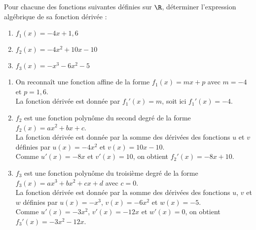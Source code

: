 \documentclass[a4paper,11pt,exos]{nsi} %
\begin{document}

\maketitle

\begin{exercice}
    Pour chacune des fonctions suivantes définies sur $\R$, déterminer l'expression algébrique de sa fonction dérivée :
    \begin{multicols}{3}
        \begin{enumerate}
            \item $f_1(x)=-4x+1{,}6$
        
            \item $f_2(x)= -4x^2+10x-10$
            \item $f_3(x)= -x^3-6x^2-5$
        \end{enumerate}
    \end{multicols}
    
    \end{exercice}

        \begin{enumerate}
            \item On reconnaît une fonction affine de la forme $f_1(x)=mx+p$ avec $m=-4$ et $p=1{,}6$.\\
            La fonction dérivée est donnée par $f_1'(x)=m$, soit ici $f_1'(x)=-4$.
        
            \item $f_2$ est une fonction polynôme du second degré de la forme $f_2(x)=ax^2+bx+c$.\\
            La fonction dérivée est donnée par la somme des dérivées des fonctions $u$ et $v$ définies par $u(x)=-4x^2$ et $v(x)=10x-10$.\\
             Comme $u'(x)=-8x$ et $v'(x)=10$, on obtient  $f_2'(x)=-8x+10$.
            
            \item $f_3$ est une fonction polynôme du troisième degré de la forme $f_3(x)=ax^3+bx^2+cx+d$ avec $c=0$.\\
            La fonction dérivée est donnée par la somme des dérivées des fonctions $u$, $v$ et $w$ définies par $u(x)=-x^3$, $v(x)=-6x^2$ et $w(x)=-5$.\\
             Comme $u'(x)=-3x^2$, $v'(x)=-12x$ et $w'(x)=0$, on obtient  $f_3'(x)=-3x^2-12x$. 
        \end{enumerate}
\end{document}
